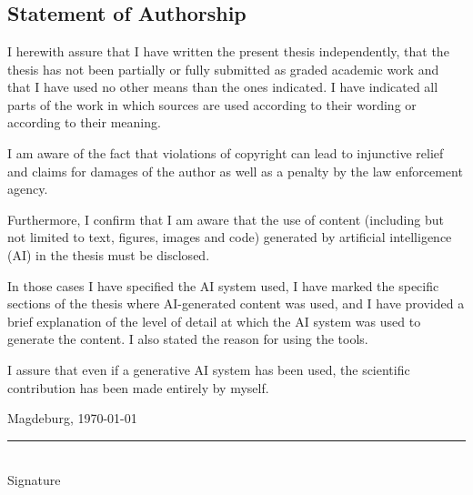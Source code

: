 \documentclass[
  12pt,
  a4paper,
  printlength,
  bibliography=totoc,
  chapterprefix,
  headings=openright,
  numbers=endperiod,
  parskip=half,
  twoside
]{scrreprt}
\begin{document}




\printbibliography

\appendix



\chapter*{}

\section*{Statement of Authorship}

I herewith assure that I have written the present thesis independently, that the thesis has not been
partially or fully submitted as graded academic work and that I have used no other means than the
ones indicated. I have indicated all parts of the work in which sources are used according to their
wording or according to their meaning.

I am aware of the fact that violations of copyright can lead to injunctive relief and claims for damages
of the author as well as a penalty by the law enforcement agency.

Furthermore, I confirm that I am aware that the use of content (including but not limited to text,
figures, images and code) generated by artificial intelligence (AI) in the thesis must be disclosed. 

In those cases I have specified the AI system used, I have marked the specific sections of the thesis
where AI-generated content was used, and I have provided a brief explanation of the level of detail at
which the AI system was used to generate the content. I also stated the reason for using the tools.

I assure that even if a generative AI system has been used, the scientific contribution has been made
entirely by myself.

\bigskip

Magdeburg, \today

\bigskip
\bigskip

\rule{0.5\textwidth}{0.5pt}\\
\hspace*{0.25em}Signature
\end{document}
